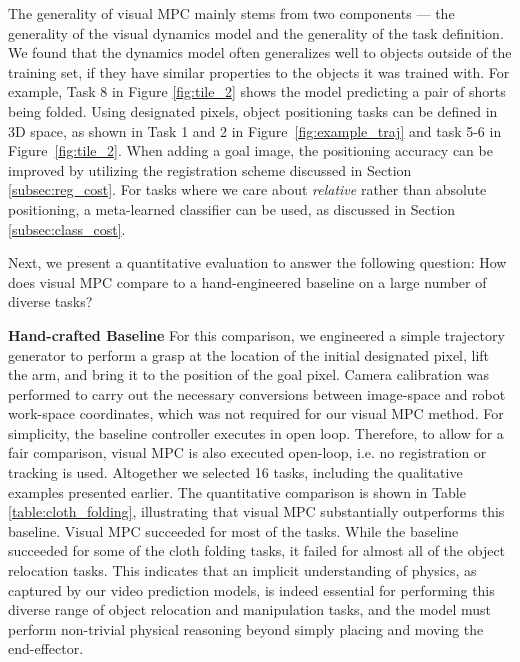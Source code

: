 The generality of visual MPC mainly stems from two components --- the generality of the visual dynamics model and the generality of the task definition.
We found that the dynamics model often generalizes well to objects outside of the training set, if they have similar properties to the objects it was trained with. For example, Task 8 in Figure \ref{fig:tile_2} shows the model predicting a pair of shorts being folded.  Using designated pixels, object positioning tasks can be defined in 3D space, as shown in Task 1 and 2 in Figure~\ref{fig:example_traj} and task 5-6 in Figure~\ref{fig:tile_2}. When adding a goal image, the positioning accuracy can be improved by utilizing the registration scheme discussed in Section \ref{subsec:reg_cost}.
For tasks where we care about \emph{relative} rather than absolute positioning, a meta-learned classifier can be used, as discussed in Section \ref{subsec:class_cost}.

Next, we present a quantitative evaluation to answer the following question: How does visual MPC compare to a hand-engineered baseline on a large number of diverse tasks?

\noindent \textbf{Hand-crafted Baseline} For this comparison, we engineered a simple trajectory generator to perform a grasp at the location of the initial designated pixel, lift the arm, and bring it to the position of the goal pixel. Camera calibration was performed to carry out the necessary conversions between image-space and robot work-space coordinates, which was not required for our visual MPC method. For simplicity, the baseline controller executes in open loop. Therefore, to allow for a fair comparison, visual MPC is also executed open-loop, i.e. no registration or tracking is used.
Altogether we selected 16 tasks, including the qualitative examples presented earlier.
The quantitative comparison is shown in Table \ref{table:cloth_folding}, illustrating that visual MPC substantially outperforms this baseline.
Visual MPC succeeded for most of the tasks. While the baseline succeeded for some of the cloth folding tasks, it failed for almost all of the object relocation tasks. This indicates that an implicit understanding of physics, as captured by our video prediction models, is indeed essential for performing this diverse range of object relocation and manipulation tasks, and the model must perform non-trivial physical reasoning beyond simply placing and moving the end-effector.


